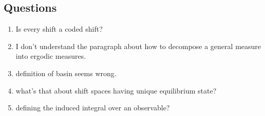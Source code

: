\documentclass[11pt, reqno]{amsart}
\theoremstyle{plain}
\numberwithin{thm}{subsection}
\theoremstyle{definition}
\begin{document}
\subsection{Questions}
\begin{enumerate}
  \item Is every shift a coded shift?
  \item I don't understand the paragraph about how to decompose a general measure into ergodic measures.
  \item definition of basin seems wrong.
  \item what's that about shift spaces having unique equilibrium state?
  \item defining the induced integral over an observable?
\end{enumerate}
\newpage




\appendix
\end{document}
